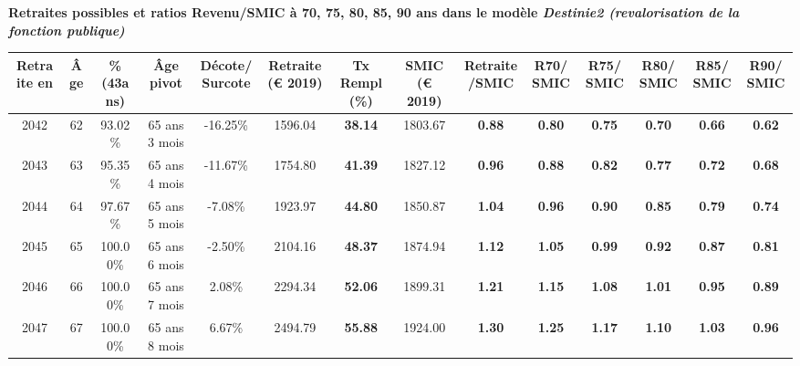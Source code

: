  \vspace{0.1cm} 
{\bf \noindent Retraites possibles et ratios Revenu/SMIC à 70, 75, 80, 85, 90 ans dans le modèle \emph{Destinie2 (revalorisation de la fonction publique)}}  
 
\begin{adjustbox}{max width=\textwidth} 
\begin{tabular}[htb]{|c|c||c|c|c||c|c||c|c||c|c|c|c|c|} 
\hline 
 Retraite en &  Âge &  \%(43ans) &  Âge pivot &  Décote/Surcote &  Retraite (\euro{} 2019) &  Tx Rempl(\%) &  SMIC (\euro{} 2019) &  Retraite/SMIC &  R70/SMIC &  R75/SMIC &  R80/SMIC &  R85/SMIC &  R90/SMIC \\ 
\hline \hline 
 2042 &  62 &  93.02\% &  65 ans 3 mois &  -16.25\% &  1596.04 &  {\bf 38.14} &  1803.67 &  {\bf {\color{red} 0.88}} &  {\bf {\color{red} 0.80}} &  {\bf {\color{red} 0.75}} &  {\bf {\color{red} 0.70}} &  {\bf {\color{red} 0.66}} &  {\bf {\color{red} 0.62}} \\ 
\hline 
 2043 &  63 &  95.35\% &  65 ans 4 mois &  -11.67\% &  1754.80 &  {\bf 41.39} &  1827.12 &  {\bf {\color{red} 0.96}} &  {\bf {\color{red} 0.88}} &  {\bf {\color{red} 0.82}} &  {\bf {\color{red} 0.77}} &  {\bf {\color{red} 0.72}} &  {\bf {\color{red} 0.68}} \\ 
\hline 
 2044 &  64 &  97.67\% &  65 ans 5 mois &  -7.08\% &  1923.97 &  {\bf 44.80} &  1850.87 &  {\bf 1.04} &  {\bf {\color{red} 0.96}} &  {\bf {\color{red} 0.90}} &  {\bf {\color{red} 0.85}} &  {\bf {\color{red} 0.79}} &  {\bf {\color{red} 0.74}} \\ 
\hline 
 2045 &  65 &  100.00\% &  65 ans 6 mois &  -2.50\% &  2104.16 &  {\bf 48.37} &  1874.94 &  {\bf 1.12} &  {\bf 1.05} &  {\bf {\color{red} 0.99}} &  {\bf {\color{red} 0.92}} &  {\bf {\color{red} 0.87}} &  {\bf {\color{red} 0.81}} \\ 
\hline 
 2046 &  66 &  100.00\% &  65 ans 7 mois &  2.08\% &  2294.34 &  {\bf 52.06} &  1899.31 &  {\bf 1.21} &  {\bf 1.15} &  {\bf 1.08} &  {\bf 1.01} &  {\bf {\color{red} 0.95}} &  {\bf {\color{red} 0.89}} \\ 
\hline 
 2047 &  67 &  100.00\% &  65 ans 8 mois &  6.67\% &  2494.79 &  {\bf 55.88} &  1924.00 &  {\bf 1.30} &  {\bf 1.25} &  {\bf 1.17} &  {\bf 1.10} &  {\bf 1.03} &  {\bf {\color{red} 0.96}} \\ 
\hline 
\hline 
\end{tabular} 
\end{adjustbox} 
 
 \vspace{0.1cm} 

